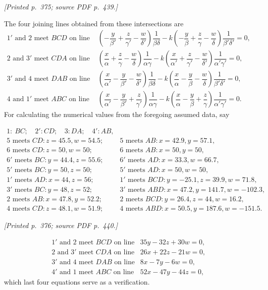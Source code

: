 \documentclass[11pt,a4paper]{article}
\newcommand{\sourcepage}[2]{\par\smallskip\noindent\textit{[Printed p.~#1; source PDF p.~#2.]}\par\smallskip}
\begin{document}
\sourcepage{375}{439}
The four joining lines obtained from these intersections are
\[
\begin{array}{rl}
1'\text{ and }2\text{ meet }BCD\text{ on line }&
\left(-\dfrac{y}{\beta'}+\dfrac{z}{\gamma'}-\dfrac{w}{\delta'}\right)\dfrac1{\beta\delta}
-k\left(-\dfrac{y}{\beta}+\dfrac{z}{\gamma}-\dfrac{w}{\delta}\right)\dfrac1{\beta'\delta'}=0,\\[2mm]
2\text{ and }3'\text{ meet }CDA\text{ on line }&
\left(\dfrac{x}{\alpha}+\dfrac{z}{\gamma}-\dfrac{w}{\delta}\right)\dfrac1{\alpha\gamma}
-k\left(\dfrac{x}{\alpha'}+\dfrac{z}{\gamma'}-\dfrac{w}{\delta'}\right)\dfrac1{\alpha'\gamma'}=0,\\[2mm]
3'\text{ and }4\text{ meet }DAB\text{ on line }&
\left(\dfrac{x}{\alpha'}-\dfrac{y}{\beta'}-\dfrac{w}{\delta'}\right)\dfrac1{\beta\delta}
-k\left(\dfrac{x}{\alpha}-\dfrac{y}{\beta}-\dfrac{w}{\delta}\right)\dfrac1{\beta'\delta'}=0,\\[2mm]
4\text{ and }1'\text{ meet }ABC\text{ on line }&
\left(\dfrac{x}{\alpha'}-\dfrac{y}{\beta'}+\dfrac{z}{\gamma'}\right)\dfrac1{\alpha\gamma}
-k\left(\dfrac{x}{\alpha}-\dfrac{y}{\beta}+\dfrac{z}{\gamma}\right)\dfrac1{\alpha'\gamma'}=0.
\end{array}
\]
For calculating the numerical values from the foregoing assumed data, say
\begin{center}
\scriptsize
$
\begin{array}{lll}
1:\ BC;\quad 2':CD;\quad 3:DA;\quad 4':AB,\\
5\text{ meets }CD: z=45.5,w=54.5;&5\text{ meets }AB:x=42.9,y=57.1,\\
6\text{ meets }CD: z=50,w=50;&6\text{ meets }AB:x=50,y=50,\\
6'\text{ meets }BC:y=44.4,z=55.6;&6'\text{ meets }AD:x=33.3,w=66.7,\\
5'\text{ meets }BC:y=50,z=50;&5'\text{ meets }AD:x=50,w=50,\\
1'\text{ meets }AD:x=44,z=56;&1'\text{ meets }BCD:y=-25.1,z=39.9,w=71.8,\\
3'\text{ meets }BC:y=48,z=52;&3'\text{ meets }ABD:x=47.2,y=141.7,w=-102.3,\\
2\text{ meets }AB:x=47.8,y=52.2;&2\text{ meets }BCD:y=26.4,z=44,w=16.2,\\
4\text{ meets }CD:z=48.1,w=51.9;&4\text{ meets }ABD:x=50.5,y=187.6,w=-151.5.
\end{array}
$
\end{center}

\sourcepage{376}{440}
\[
\begin{array}{ll}
1'\text{ and }2\text{ meet }BCD\text{ on line} & 35y-32z+30w=0,\\
2\text{ and }3'\text{ meet }CDA\text{ on line} & 26x+22z-21w=0,\\
3'\text{ and }4\text{ meet }DAB\text{ on line} & 8x-7y-6w=0,\\
4'\text{ and }1\text{ meet }ABC\text{ on line} & 52x-47y-44z=0,
\end{array}
\]
which last four equations serve as a verification.
\end{document}
